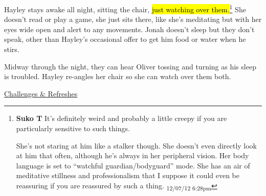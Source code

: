 Hayley stays awake all night, sitting the chair, \hl{just watching over them.}\footnote{\textbf{Suko T }It's definitely weird and probably a little creepy if you are particularly sensitive to such things. 

She's not staring at him like a stalker though.  She doesn't even directly look at him that often, although he's always in her peripheral vision.  Her body language is set to ``watchful guardian/bodyguard'' mode. She has an air of meditative stillness and professionalism that I suppose it could even be reassuring if you are reassured by such a thing. \textsubscript{12/07/12 6:28pm}}  She doesn't read or play a game, she just sits there, like she's meditating but with her eyes wide open and alert to any movements.  Jonah doesn't sleep but they don't speak, other than Hayley's occasional offer to get him food or water when he stirs.



Midway through the night, they can hear Oliver tossing and turning as his sleep is troubled.  Hayley re-angles her chair so she can watch over them both.





\underline{  {\LARGE Challenges \& Refreshes }  }



